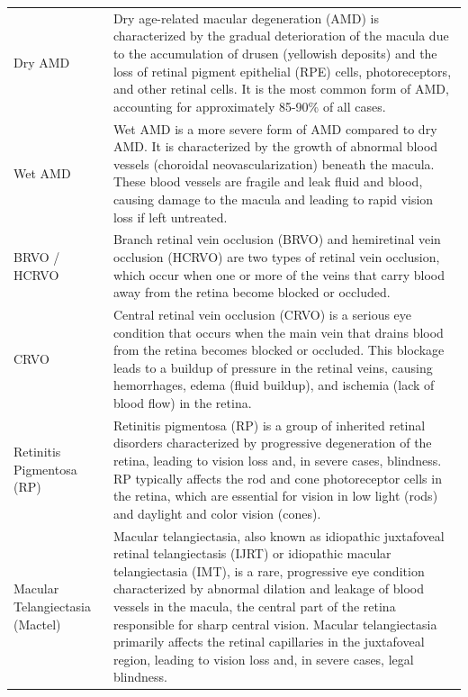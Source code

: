 \documentclass{article}
\begin{document}
{{\begin{longtable}{lp{3.8in}}
				\multicolumn{1}{l}{Dry AMD} & Dry age-related macular degeneration (AMD) is characterized by the gradual deterioration of the macula due to the accumulation of drusen (yellowish deposits) and the loss of retinal pigment epithelial (RPE) cells, photoreceptors, and other retinal cells. It is the most common form of AMD, accounting for approximately 85-90\% of all cases.\\
				
				\multicolumn{1}{l}{Wet AMD} & Wet AMD is a more severe form of AMD compared to dry AMD. It is characterized by the growth of abnormal blood vessels (choroidal neovascularization) beneath the macula. These blood vessels are fragile and leak fluid and blood, causing damage to the macula and leading to rapid vision loss if left untreated.\\
				
				\multicolumn{1}{l}{BRVO / HCRVO} & Branch retinal vein occlusion (BRVO) and hemiretinal vein occlusion (HCRVO) are two types of retinal vein occlusion, which occur when one or more of the veins that carry blood away from the retina become blocked or occluded.\\
				
				\multicolumn{1}{l}{CRVO} & Central retinal vein occlusion (CRVO) is a serious eye condition that occurs when the main vein that drains blood from the retina becomes blocked or occluded. This blockage leads to a buildup of pressure in the retinal veins, causing hemorrhages, edema (fluid buildup), and ischemia (lack of blood flow) in the retina. \\
				
				\multicolumn{1}{l}{Retinitis Pigmentosa (RP)} & Retinitis pigmentosa (RP) is a group of inherited retinal disorders characterized by progressive degeneration of the retina, leading to vision loss and, in severe cases, blindness. RP typically affects the rod and cone photoreceptor cells in the retina, which are essential for vision in low light (rods) and daylight and color vision (cones). \\
				
				\multicolumn{1}{l}{Macular Telangiectasia (Mactel)} & 
				Macular telangiectasia, also known as idiopathic juxtafoveal retinal telangiectasis (IJRT) or idiopathic macular telangiectasia (IMT), is a rare, progressive eye condition characterized by abnormal dilation and leakage of blood vessels in the macula, the central part of the retina responsible for sharp central vision. Macular telangiectasia primarily affects the retinal capillaries in the juxtafoveal region, leading to vision loss and, in severe cases, legal blindness.\\
				
				\bottomrule
			\end{longtable}
		}
	}
	
\end{document}
